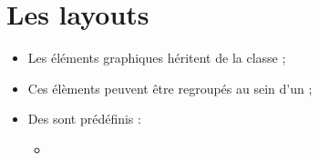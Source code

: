 \section{Les layouts}
\begin{itemize}
    \item Les éléments graphiques héritent de la classe  ;
    \item Ces élèments peuvent être regroupés au sein d'un  ;
    \item Des  sont prédéfinis :
        \begin{itemize}
            \item 
        \end{itemize}
\end{itemize}
